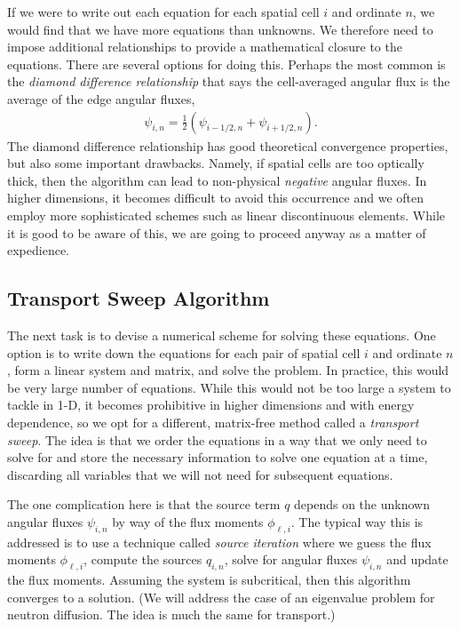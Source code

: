 If we were to write out each equation for each spatial cell $i$ and ordinate $n$, we would find that we have more equations than unknowns. We therefore need to impose additional relationships to provide a mathematical closure to the equations. There are several options for doing this. Perhaps the most common is the \emph{diamond difference relationship} that says the cell-averaged angular flux is the average of the edge angular fluxes,
\begin{align}
  \psi_{i,n} = \frac{1}{2} \left( \psi_{i-1/2,n} + \psi_{i+1/2,n} \right) . \label{Eq:neutronics_diamondDifferenceRelationship}
\end{align}
The diamond difference relationship has good theoretical convergence properties, but also some important drawbacks. Namely, if spatial cells are too optically thick, then the algorithm can lead to non-physical \emph{negative} angular fluxes. In higher dimensions, it becomes difficult to avoid this occurrence and we often employ more sophisticated schemes such as linear discontinuous elements. While it is good to be aware of this, we are going to proceed anyway as a matter of expedience.




\subsection{Transport Sweep Algorithm}

The next task is to devise a numerical scheme for solving these equations. One option is to write down the equations for each pair of spatial cell $i$ and ordinate $n$, form a linear system and matrix, and solve the problem. In practice, this would be very large number of equations. While this would not be too large a system to tackle in 1-D, it becomes prohibitive in higher dimensions and with energy dependence, so we opt for a different, matrix-free method called a \emph{transport sweep}. The idea is that we order the equations in a way that we only need to solve for and store the necessary information to solve one equation at a time, discarding all variables that we will not need for subsequent equations.

The one complication here is that the source term $q$ depends on the unknown angular fluxes $\psi_{i,n}$ by way of the flux moments $\phi_{\ell,i}$. The typical way this is addressed is to use a technique called \emph{source iteration} where we guess the flux moments $\phi_{\ell,i}$, compute the sources $q_{i,n}$, solve for angular fluxes $\psi_{i,n}$ and update the flux moments. Assuming the system is subcritical, then this algorithm converges to a solution. (We will address the case of an eigenvalue problem for neutron diffusion. The idea is much the same for transport.)

